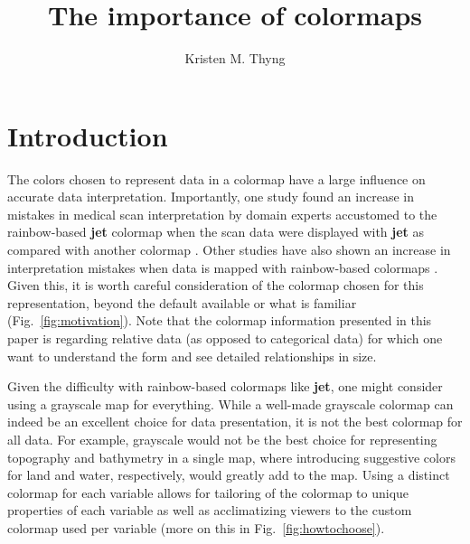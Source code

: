 \documentclass[10pt,journal,compsoc]{IEEEtran}
\begin{document}
\title{The importance of colormaps}



\author{%
	Kristen M. Thyng
	}




\maketitle


\section{Introduction}

The colors chosen to represent data in a colormap have a large influence on accurate data interpretation. Importantly, one study found an increase in mistakes in medical scan interpretation by domain experts accustomed to the rainbow-based \textbf{jet} colormap when the scan data were displayed with \textbf{jet} as compared with another colormap \citep{Spence:1999ea}. Other studies have also shown an increase in interpretation mistakes when data is mapped with rainbow-based colormaps  \citep{borkin2011evaluation,Bryant:2014bh}. Given this, it is worth careful consideration of the colormap chosen for this representation, beyond the default available or what is familiar (Fig.~\ref{fig:motivation}). Note that the colormap information presented in this paper is regarding relative data (as opposed to categorical data) for which one want to understand the form and see detailed relationships in size.

Given the difficulty with rainbow-based colormaps like \textbf{jet}, one might consider using a grayscale map for everything. While a well-made grayscale colormap can indeed be an excellent choice for data presentation, it is not the best colormap for all data. For example, grayscale would not be the best choice for representing topography and bathymetry in a single map, where introducing suggestive colors for land and water, respectively, would greatly add to the map. Using a distinct colormap for each variable allows for tailoring of the colormap to unique properties of each variable as well as acclimatizing viewers to the custom colormap used per variable (more on this in Fig.~\ref{fig:howtochoose}).
\end{document}
